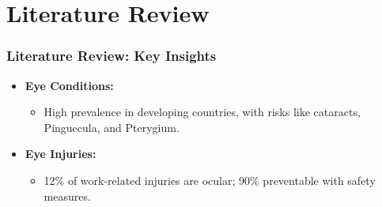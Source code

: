 \section{Literature Review}
\begin{frame}[shrink]
    \frametitle{Literature Review: Key Insights}
    \begin{itemize}
        \item \textbf{Eye Conditions:}
            \begin{itemize}
                \item High prevalence in developing countries, with risks like cataracts, \gls{Pinguecula}, and \gls{Pterygium}.
            \end{itemize}
        \item \textbf{Eye Injuries:}
            \begin{itemize}
                \item 12\% of work-related injuries are ocular; 90\% preventable with safety measures.\parencite{iyiade2012pattern, modenese2018occupational, gebremeskel2019prevalence}
            \end{itemize}
        
    \end{itemize}
\end{frame}
    